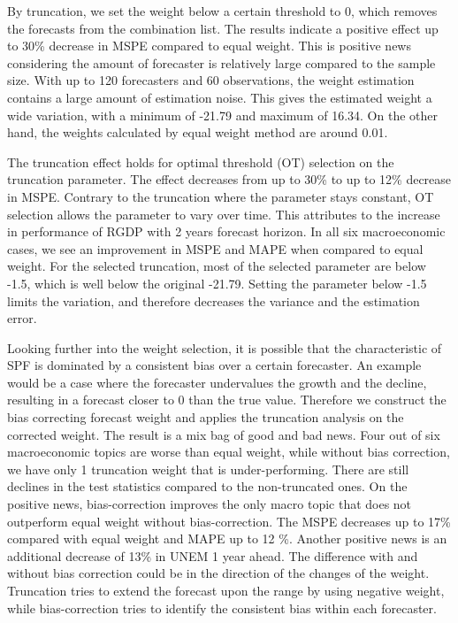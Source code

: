 \documentclass[11pt]{article}
\begin{document}
By truncation, we set the weight below a certain threshold to 0, which removes the forecasts from the combination list. The results indicate a positive effect up to 30\% decrease in MSPE compared to equal weight. 
This is positive news considering the amount of forecaster is relatively large compared to the sample size. 
With up to 120 forecasters and 60 observations, the weight estimation contains a large amount of estimation noise.
This gives the estimated weight a wide variation, with a minimum of -21.79 and maximum of 16.34. On the other hand, the weights calculated by equal weight method are around 0.01.

The truncation effect holds for optimal threshold (OT) selection on the truncation parameter. The effect decreases from up to 30\% to up to 12\% decrease in MSPE. Contrary to the truncation where the parameter stays constant, OT selection allows the parameter to vary over time. This attributes to the increase in performance of RGDP with 2 years forecast horizon. In all six macroeconomic cases, we see an improvement in MSPE and MAPE when compared to equal weight. For the selected truncation, most of the selected parameter are below -1.5, which is well below the original -21.79. Setting the parameter below -1.5 limits the variation, and therefore decreases the variance and the estimation error.

Looking further into the weight selection, it is possible that the characteristic of SPF is dominated by a consistent bias over a certain forecaster. An example would be a case where the forecaster undervalues the growth and the decline, resulting in a forecast closer to 0 than the true value. Therefore we construct the bias correcting forecast weight and applies the truncation analysis on the corrected weight. The result is a mix bag of good and bad news. Four out of six macroeconomic topics are worse than equal weight, while without bias correction, we have only 1 truncation weight that is under-performing. There are still declines in the test statistics compared to the non-truncated ones. On the positive news, bias-correction improves the only macro topic that does not outperform equal weight without bias-correction. The MSPE decreases up to 17\% compared with equal weight and MAPE up to 12 \%. Another positive news is an additional decrease of 13\% in UNEM 1 year ahead. The difference with and without bias correction could be in the direction of the changes of the weight. Truncation tries to extend the forecast upon the range by using negative weight, while bias-correction tries to identify the consistent bias within each forecaster.
\end{document}
